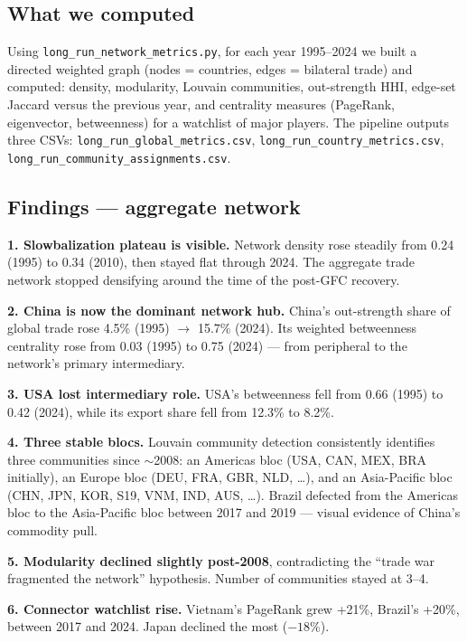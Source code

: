 \documentclass[11pt,a4paper]{article}
\begin{document}
\subsection{What we computed}

Using \texttt{long\_run\_network\_metrics.py}, for each year 1995--2024 we
built a directed weighted graph (nodes = countries, edges = bilateral
trade) and computed: density, modularity, Louvain communities,
out-strength HHI, edge-set Jaccard versus the previous year, and centrality
measures (PageRank, eigenvector, betweenness) for a watchlist of major
players. The pipeline outputs three CSVs:
\texttt{long\_run\_global\_metrics.csv},
\texttt{long\_run\_country\_metrics.csv},
\texttt{long\_run\_community\_assignments.csv}.

\subsection{Findings — aggregate network}

\begin{findbox}
\textbf{1. Slowbalization plateau is visible.} Network density rose
steadily from 0.24 (1995) to 0.34 (2010), then stayed flat through 2024.
The aggregate trade network stopped densifying around the time of the
post-GFC recovery.

\textbf{2. China is now the dominant network hub.} China's
out-strength share of global trade rose 4.5\% (1995) $\to$ 15.7\% (2024).
Its weighted betweenness centrality rose from 0.03 (1995) to 0.75 (2024)
— from peripheral to the network's primary intermediary.

\textbf{3. USA lost intermediary role.} USA's betweenness fell from 0.66
(1995) to 0.42 (2024), while its export share fell from 12.3\% to 8.2\%.

\textbf{4. Three stable blocs.} Louvain community detection consistently
identifies three communities since $\sim$2008: an Americas bloc
(USA, CAN, MEX, BRA initially), an Europe bloc (DEU, FRA, GBR, NLD,
\ldots), and an Asia-Pacific bloc (CHN, JPN, KOR, S19, VNM, IND, AUS,
\ldots). Brazil defected from the Americas bloc to the Asia-Pacific bloc
between 2017 and 2019 — visual evidence of China's commodity pull.

\textbf{5. Modularity declined slightly post-2008}, contradicting the
``trade war fragmented the network'' hypothesis. Number of communities
stayed at 3--4.

\textbf{6. Connector watchlist rise.} Vietnam's PageRank grew +21\%,
Brazil's +20\%, between 2017 and 2024. Japan declined the most ($-18\%$).
\end{findbox}
\end{document}

